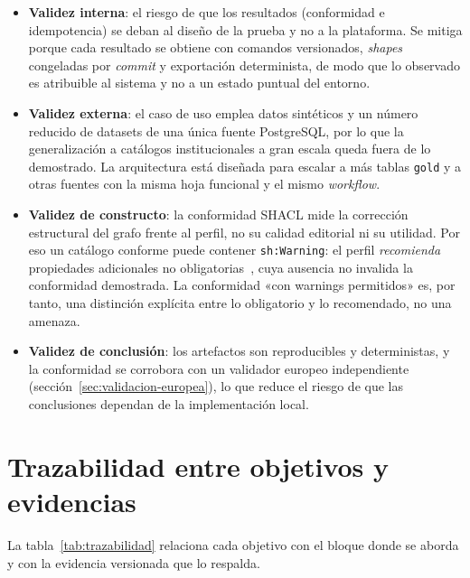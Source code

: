 \begin{itemize}
  \item \textbf{Validez interna}: el riesgo de que los resultados (conformidad e idempotencia) se deban al diseño de la prueba y no a la plataforma. Se mitiga porque cada resultado se obtiene con comandos versionados, \emph{shapes} congeladas por \emph{commit} y exportación determinista, de modo que lo observado es atribuible al sistema y no a un estado puntual del entorno.
  \item \textbf{Validez externa}: el caso de uso emplea datos sintéticos y un número reducido de datasets de una única fuente PostgreSQL, por lo que la generalización a catálogos institucionales a gran escala queda fuera de lo demostrado. La arquitectura está diseñada para escalar a más tablas \texttt{gold} y a otras fuentes con la misma hoja funcional y el mismo \emph{workflow}.
  \item \textbf{Validez de constructo}: la conformidad \ac{SHACL} mide la corrección estructural del grafo frente al perfil, no su calidad editorial ni su utilidad. Por eso un catálogo conforme puede contener \texttt{sh:Warning}: el perfil \emph{recomienda} propiedades adicionales no obligatorias~\cite{w3cShacl}, cuya ausencia no invalida la conformidad demostrada. La conformidad «con warnings permitidos» es, por tanto, una distinción explícita entre lo obligatorio y lo recomendado, no una amenaza.
  \item \textbf{Validez de conclusión}: los artefactos son reproducibles y deterministas, y la conformidad se corrobora con un validador europeo independiente (sección~\ref{sec:validacion-europea}), lo que reduce el riesgo de que las conclusiones dependan de la implementación local.
\end{itemize}

\section{Trazabilidad entre objetivos y evidencias}\label{sec:trazabilidad}

La tabla~\ref{tab:trazabilidad} relaciona cada objetivo con el bloque donde se aborda y con la evidencia versionada que lo respalda.

